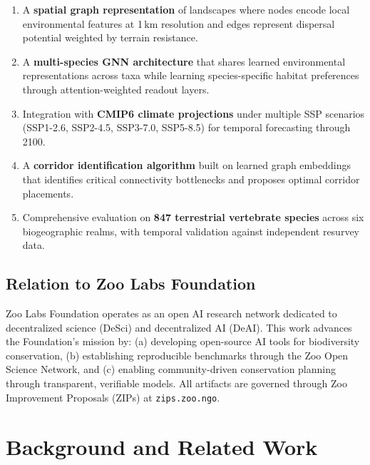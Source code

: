\documentclass[11pt,a4paper]{article}
\begin{document}
\begin{enumerate}
  \item A \textbf{spatial graph representation} of landscapes where
    nodes encode local environmental features at 1\,km resolution and
    edges represent dispersal potential weighted by terrain resistance.

  \item A \textbf{multi-species GNN architecture} that shares learned
    environmental representations across taxa while learning
    species-specific habitat preferences through attention-weighted
    readout layers.

  \item Integration with \textbf{CMIP6 climate projections} under
    multiple SSP scenarios (SSP1-2.6, SSP2-4.5, SSP3-7.0, SSP5-8.5)
    for temporal forecasting through 2100.

  \item A \textbf{corridor identification algorithm} built on learned
    graph embeddings that identifies critical connectivity bottlenecks
    and proposes optimal corridor placements.

  \item Comprehensive evaluation on \textbf{847 terrestrial vertebrate
    species} across six biogeographic realms, with temporal validation
    against independent resurvey data.
\end{enumerate}

\subsection{Relation to Zoo Labs Foundation}

Zoo Labs Foundation operates as an open AI research network dedicated to
decentralized science (DeSci) and decentralized AI (DeAI). This work
advances the Foundation's mission by: (a) developing open-source AI
tools for biodiversity conservation, (b) establishing reproducible
benchmarks through the Zoo Open Science Network, and (c) enabling
community-driven conservation planning through transparent, verifiable
models. All artifacts are governed through Zoo Improvement Proposals
(ZIPs) at \texttt{zips.zoo.ngo}.


\section{Background and Related Work}
\label{sec:background}
\end{document}
